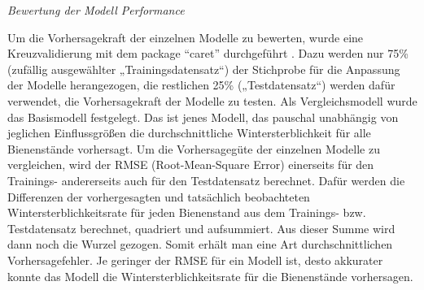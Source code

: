 \textit{Bewertung der Modell Performance}

Um die Vorhersagekraft der einzelnen Modelle zu bewerten, wurde eine Kreuzvalidierung mit dem package \enquote{caret} durchgeführt \citep{caret}. Dazu werden nur 75\% (zufällig ausgewählter „Trainingsdatensatz“) der Stichprobe für die Anpassung der Modelle herangezogen, die restlichen 25\% („Testdatensatz“) werden dafür verwendet, die Vorhersagekraft der Modelle zu testen. Als Vergleichsmodell wurde das Basismodell festgelegt. Das ist jenes Modell, das pauschal unabhängig von jeglichen Einflussgrößen die durchschnittliche Wintersterblichkeit für alle Bienenstände vorhersagt. Um die Vorhersagegüte der einzelnen Modelle zu vergleichen, wird der RMSE (Root-Mean-Square Error) einerseits für den Trainings- andererseits auch für den Testdatensatz berechnet. Dafür werden die Differenzen der vorhergesagten und tatsächlich beobachteten Wintersterblichkeitsrate für jeden Bienenstand aus dem Trainings- bzw. Testdatensatz berechnet, quadriert und aufsummiert. Aus dieser Summe wird dann noch die Wurzel gezogen. Somit erhält man eine Art durchschnittlichen Vorhersagefehler. Je geringer der RMSE für ein Modell ist, desto akkurater konnte das Modell die Wintersterblichkeitsrate für die Bienenstände vorhersagen.